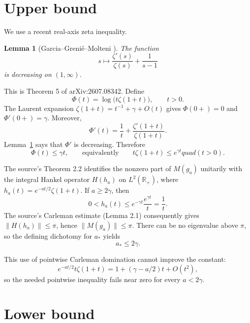 \documentclass[11pt]{article}
\newtheorem{lemma}{Lemma}
\newcommand{\R}{\mathbb R}
\begin{document}
\section*{Upper bound}

We use a recent real-axis zeta inequality.

\begin{lemma}[Garcia--Greni\'e--Molteni \cite{GGM}]\label{lem:zeta}
The function
\[
 s\longmapsto \frac{\zeta'(s)}{\zeta(s)}+\frac{1}{s-1}
\]
is decreasing on $(1,\infty)$.
\end{lemma}

This is Theorem 5 of arXiv:2607.08342.  Define
\[
 \Phi(t)=\log\bigl(t\zeta(1+t)\bigr),\qquad t>0.
\]
The Laurent expansion $\zeta(1+t)=t^{-1}+\gamma+O(t)$ gives
$\Phi(0+)=0$ and $\Phi'(0+)=\gamma$.  Moreover,
\[
 \Phi'(t)=\frac1t+\frac{\zeta'(1+t)}{\zeta(1+t)}.
\]
Lemma~\ref{lem:zeta} says that $\Phi'$ is decreasing.  Therefore
\begin{equation}\label{eq:zetaexp}
 \Phi(t)\leq\gamma t,
 \qquad\text{equivalently}\qquad
 t\zeta(1+t)\leq e^{\gamma t}quad(t>0).
\end{equation}

The source's Theorem 2.2 identifies the nonzero part of $M(g_a)$ unitarily
with the integral Hankel operator $H(h_a)$ on $L^2(\R_+)$, where
$h_a(t)=e^{-at/2}\zeta(1+t)$.  If $a\geq2\gamma$, then
\[
 0<h_a(t)\leq e^{-\gamma t}\frac{e^{\gamma t}}t=\frac1t.
\]
The source's Carleman estimate (Lemma 2.1) consequently gives
$\lVert H(h_a)\rVert\leq\pi$, hence
$\lVert M(g_a)\rVert\leq\pi$.  There can be no eigenvalue above $\pi$, so
the defining dichotomy for $a_*$ yields
\begin{equation}\label{eq:upper}
 a_*\leq2\gamma.
\end{equation}

This use of pointwise Carleman domination cannot improve the constant:
\[
 e^{-at/2}t\zeta(1+t)
 =1+(\gamma-a/2)t+O(t^2),
\]
so the needed pointwise inequality fails near zero for every $a<2\gamma$.

\section*{Lower bound}
\end{document}
